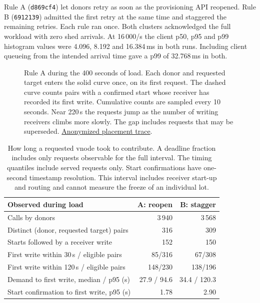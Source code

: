 \documentclass[11pt]{article}
\begin{document}
Rule A (\texttt{d869cf4}) let donors retry as soon as the provisioning API reopened. Rule B (\texttt{6912139}) admitted the first retry at the same time and staggered the remaining retries. Each rule ran once. Both clusters acknowledged the full workload with zero shed arrivals. At 16\,000/s the client p50, p95 and p99 histogram values were 4.096, 8.192 and 16.384\,ms in both runs. Including client queueing from the intended arrival time gave a p99 of 32.768\,ms in both.

\begin{figure}[H]
\centering
{}
\caption{Rule A during the 400 seconds of load. Each donor and requested target enters the solid curve once, on its first request. The dashed curve counts pairs with a confirmed start whose receiver has recorded its first write. Cumulative counts are sampled every 10 seconds. Near 220\,s the requests jump as the number of writing receivers climbs more slowly. The gap includes requests that may be superseded. \href{https://github.com/indexus/core/blob/e4b90728ee3054f2d2944485f413c9ae3e5ef2be/docs/benchmarks/aws-placement-100-20261127/granular50/aws-pair-a.json.gz}{Anonymized placement trace}.}
\end{figure}

\begin{table}[H]
\centering\small
\begin{tabularx}{\linewidth}{@{}Lrr@{}}
\toprule
Observed during load & A: reopen & B: stagger \\
\midrule
Calls by donors & 3\,940 & 3\,568 \\
Distinct (donor, requested target) pairs & 316 & 309 \\
Starts followed by a receiver write & 152 & 150 \\
First write within 30\,s / eligible pairs & 85/316 & 67/308 \\
First write within 120\,s / eligible pairs & 148/230 & 138/196 \\
Demand to first write, median / p95 (s) & 27.9 / 94.6 & 34.4 / 120.3 \\
Start confirmation to first write, p95 (s) & 1.78 & 2.90 \\
\bottomrule
\end{tabularx}
\caption{How long a requested vnode took to contribute. A deadline fraction includes only requests observable for the full interval. The timing quantiles include served requests only. Start confirmations have one-second timestamp resolution. This interval includes receiver start-up and routing and cannot measure the freeze of an individual lot.}
\end{table}
\end{document}

